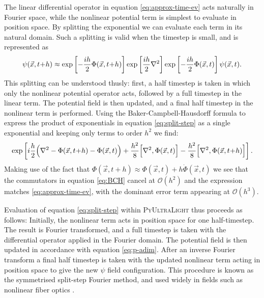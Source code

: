 \documentclass[a4paper,11pt]{article}
\newcommand{\PyUltraLight}{\textsc{PyUltraLight}\xspace}
\begin{document}
The linear differential operator in equation \ref{eq:approx-time-ev} acts naturally in Fourier space, while the nonlinear potential term is simplest to evaluate in position space. By splitting the exponential we can evaluate each term in its natural domain. Such a splitting is valid when the timestep is small, and is represented as
%
\begin{equation}\label{eq:split-step}
    \psi(\vec{x},t\hspace*{-.2em}+\hspace*{-.2em}h)\approx\operatorname{exp}\left[-\frac{ih}{2}\Phi(\vec{x},t\hspace*{-.2em}+\hspace*{-.2em}h)\right]\operatorname{exp}\left[\frac{ih}{2}\nabla^2\right]\operatorname{exp}\left[-\frac{ih}{2}\Phi(\vec{x},t)\right]\psi(\vec{x},t).
\end{equation}
%
This splitting can be understood thusly: first, a half timestep is taken in which only the nonlinear potential operator acts, followed by a full timestep in the linear term. The potential field is then updated, and a final half timestep in the nonlinear term is performed. Using the Baker-Campbell-Hausdorff formula to express the product of exponentials in equation \ref{eq:split-step} as a single exponential and keeping only terms to order $h^2$ we find:
\begin{equation}\label{eq:BCH}
    \operatorname{exp}\left[i\frac{h}{2}\Big(\nabla^2-\Phi(\vec{x},t\hspace*{-.2em}+\hspace*{-.2em}h)-\Phi(\vec{x},t)\Big)+\frac{h^2}{8}\Big[\nabla^2,\Phi(\vec{x},t)\Big]-\frac{h^2}{8}\Big[\nabla^2,\Phi(\vec{x},t\hspace*{-.2em}+\hspace*{-.2em}h)\Big]\right].
\end{equation}
Making use of the fact that $\Phi(\vec{x},t+h)\approx\Phi(\vec{x},t)+h\Dot{\Phi}(\vec{x},t)$ we see that the commutators in equation \ref{eq:BCH} cancel at $\mathcal{O}(h^2)$ and the expression matches \ref{eq:approx-time-ev}, with the dominant error term appearing at $\mathcal{O}(h^3)$. 

Evaluation of equation \ref{eq:split-step} within \PyUltraLight thus proceeds as follows:
Initially, the nonlinear term acts in position space for one half-timestep. The result is  Fourier transformed, and a full timestep is taken with the differential operator  applied in the Fourier domain. The potential field is then updated in accordance with equation \ref{eq:p-adim}. After an inverse Fourier transform a final half timestep is taken with the updated nonlinear term acting in position space to give the new $\psi$ field configuration. This procedure is known as the symmetrised split-step Fourier method, and  used widely in fields such as nonlinear fiber optics \cite{Agrawal2013, Zhang2018, Sinkin2003}. 
\end{document}
